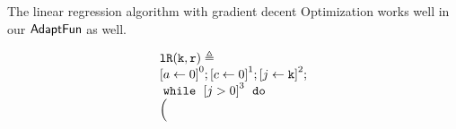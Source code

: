 %
\begin{example}
\label{ex:linearregression}
    The linear regression algorithm with gradient decent Optimization works well 
    in our $\textsf{AdaptFun}$ as well.
\begin{figure}
\centering
\begin{subfigure}{0.4\textwidth}
    \centering
    {\small
        \[
        \begin{array}{l}
            \kw{lR(k, r)} \triangleq \\
                   \clabel{ a \leftarrow 0}^{0} ; 
                   \clabel{ c \leftarrow 0}^{1} ; 
                    \clabel{\assign{j}{\kw{k}} }^{2} ; \\
                    \ewhile ~ \clabel{j > 0}^{3} ~ \edo ~ \\
                    \Big(

\end{array}\]}
\end{subfigure}
\end{figure}
\end{example}
